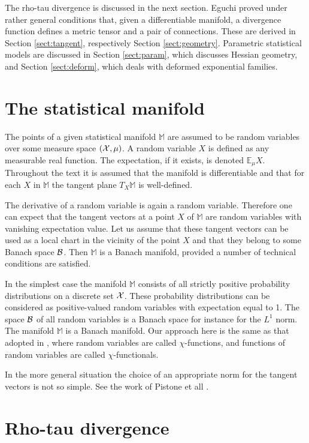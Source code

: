 \documentclass[graybox]{svmult}
\newcommand{\Mo}{\mathbb M}
\newcommand{\Eo}{\mathbb E}
\begin{document}
The rho-tau divergence is discussed in the next section. Eguchi \cite{eguchi1983,eguchi1985}
proved under rather general conditions that, given a differentiable manifold,
a divergence function defines a metric tensor and a pair of connections.
These are derived in Section \ref{sect:tangent}, respectively Section \ref{sect:geometry}.
Parametric statistical models are discussed in Section \ref{sect:param}, which
discusses Hessian geometry, and Section \ref{sect:deform}, which deals with deformed
exponential families.

\section{The statistical manifold}

The points of a given statistical manifold
$\Mo$ are assumed to be random variables over some measure space
$({\cal X}, \mu)$. 
A random variable $X$ is defined as any measurable real function.
The expectation, if it exists, is denoted $\Eo_\mu X$.
Throughout the text it is assumed that the manifold is differentiable
and that for each $X$ in $\Mo$ the tangent plane $T_X\Mo$ is well-defined.


The derivative of a random variable is again a random variable.
Therefore one can expect that
the tangent vectors at a point $X$ of $\Mo$ are random variables with vanishing expectation value.
Let us assume that these tangent vectors can be used as a local chart in the vicinity of the point $X$
and that they belong to some Banach space $\cal B$.
Then $\Mo$ is a  Banach manifold, provided a number of technical conditions are satisfied.

In the simplest case the manifold $\Mo$ consists of all strictly positive probability distributions
on a discrete set $\cal X$.
These probability distributions can be considered as positive-valued random variables with expectation equal to 1.
The space $\cal B$ of all random variables is a Banach space for instance for the $L^1$ norm.
The manifold $\Mo$ is a Banach manifold.
Our approach here is the same as that adopted in \cite {zhang13},
where random variables are called $\chi$-functions,
and functions of random variables are called $\chi$-functionals.

In the more general situation the choice of an appropriate norm for the tangent vectors is not so simple.
See the work of Pistone et all \cite{pistonesempi1995,pistonerogantin1999,pistone2009}.



\section{Rho-tau divergence}
\label{sect:rhotau}
\end{document}
